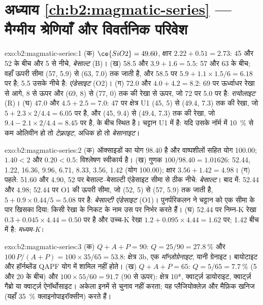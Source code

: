 \section*{अध्याय \ref{ch:b2:magmatic-series} --- मैग्मीय श्रेणियाँ और विवर्तनिक परिवेश}

\begin{solution}{exo:b2:magmatic-series:1}
(क) $\ce{SiO2} = 49.60$, क्षार $2.22 + 0.51 = 2.73$: 45 और 52 के बीच और 5 से नीचे,
\emph{बेसाल्ट} (B)। (ख) 58.5 और $3.9 + 1.6 = 5.5$: 57 और 63 के बीच; वहाँ ऊपरी
सीमा (57, 5.9) से (63, 7.0) तक जाती है, और 58.5 पर $5.9 + 1.1\times1.5/6 = 6.18$ पर है;
5.5 उसके नीचे है: \emph{एंडेसाइट} (O2)। (ग) 72.0 और $4.0 + 4.2 = 8.2$:
69 पर ऊर्ध्वाधर रेखा से आगे, 8 से ऊपर और (69, 8) से (77, 0) तक की रेखा से ऊपर, जो
72 पर 5.0 पर है: \emph{रायोलाइट} (R)। (घ) 47.0 और $4.5 + 2.5 = 7.0$: 47 पर क्षेत्र U1
(45, 5) से (49.4, 7.3) तक की रेखा, जो $5 + 2.3\times2/4.4 = 6.05$ पर है, और
(45, 9.4) से (49.4, 7.3) तक की रेखा, जो $9.4 - 2.1\times2/4.4 = 8.45$ पर है, के बीच स्थित है। चट्टान
U1 में है: यदि उसके नॉर्म में \qty{10}{\percent} से कम ओलिवीन हो तो \emph{टेफ़्राइट},
अधिक हो तो \emph{बेसानाइट}।
\end{solution}

\begin{solution}{exo:b2:magmatic-series:2}
(क) ऑक्साइडों का योग 98.40 है और वाष्पशीलों सहित योग 100.00;
 $1.40 < 2$ और  $0.20 < 0.5$: विश्लेषण स्वीकार्य है। (ख) गुणक
$100/98.40 = 1.01626$:  52.44,  1.22,  16.36,
 9.96,  6.71,  8.33,  3.56,  1.42
(योग 100.00); क्षार $3.56 + 1.42 = 4.98$। (ग) पहले: 51.60 और 4.90, 52 पर
बेसाल्ट--बेसाल्टी एंडेसाइट सीमा से ठीक नीचे: \emph{बेसाल्ट}। बाद में: 52.44 और 4.98;
52.44 पर O1 की ऊपरी सीमा, जो (52, 5) से (57, 5.9) तक जाती है, $5 + 0.9\times0.44/5
= 5.08$ पर है: \emph{बेसाल्टी एंडेसाइट} (O1)। पुनर्परिकलन ने चट्टान को एक सीमा के पार
खिसका दिया: किसी रेखा के निकट के नाम उस पर निर्भर करते हैं। (घ) 52.44 पर निम्न-K रेखा $0.3 +
0.045\times4.44 = 0.50$ पर है और उच्च-K रेखा $1.2 + 0.095\times4.44 = 1.62$ पर; 1.42
बीच में है: \emph{मध्यम-K}।
\end{solution}

\begin{solution}{exo:b2:magmatic-series:3}
(क) $Q + A + P = 90$: $Q = 25/90 = \qty{27.8}{\percent}$ और $100\,P/(A + P) =
100\times35/65 = 53.8$: क्षेत्र 3b, एक \emph{मॉन्ज़ोग्रेनाइट}, यानी ग्रेनाइट। बायोटाइट और
हॉर्नब्लेंड QAPF योग में शामिल नहीं होते। (ख) $Q + A + P = 65$: $Q = 5/65 =
\qty{7.7}{\percent}$ (5 और 20 के बीच) और $100\times55/60 = 91.7$ (90 से ऊपर): क्षेत्र
10*, क्वार्ट्ज़ डायोराइट, क्वार्ट्ज़ गैब्रो या क्वार्ट्ज़ ऐनॉर्थोसाइट। अकेला 
इनमें से चुनाव नहीं करता; यह प्लैजियोक्लेज़ और मैफ़िक खनिज (यहाँ
\qty{35}{\percent} क्लाइनोपाइरॉक्सीन) करते हैं।
\end{solution}


